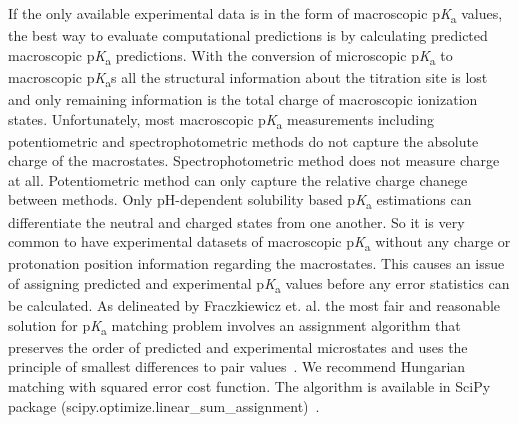 \documentclass[9pt,lineno,final]{elife}
\newcommand{\pKa}{p\textit{K}\textsubscript{a}}
\begin{document}
If the only available experimental data is in the form of macroscopic \pKa{} values, the best way to evaluate computational predictions is by calculating predicted macroscopic \pKa{} predictions. With the conversion of microscopic \pKa{} to macroscopic \pKa{}s all the structural information about the titration site is lost and only remaining information is the total charge of macroscopic ionization states. Unfortunately, most macroscopic \pKa{} measurements including potentiometric and spectrophotometric methods do not capture the absolute charge of the macrostates. Spectrophotometric method does not measure charge at all. Potentiometric method can only capture the relative charge chanege between methods.  Only pH-dependent solubility based \pKa{} estimations can differentiate the neutral and charged states from one another. So it is very common to have experimental datasets of macroscopic \pKa{} without any charge or protonation position information regarding the macrostates.
This causes an issue of assigning predicted and experimental \pKa{} values before any error statistics can be calculated.
As delineated by Fraczkiewicz et. al. the most fair and reasonable solution for \pKa{} matching problem involves an assignment algorithm that preserves the order of predicted and experimental microstates and uses the principle of smallest differences to pair values~\citep{Fraczkiewicz:2013:ReferenceModuleinChemistryMolecularSciencesandChemicalEngineering}. We recommend Hungarian matching with squared error cost function. The algorithm is available in SciPy package (scipy.optimize.linear\_sum\_assignment)~\citep{SciPy-linear-sum-assignment}.
\end{document}
